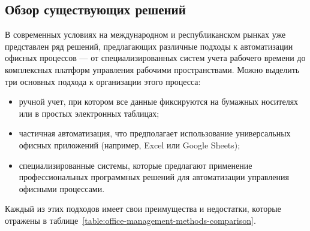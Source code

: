 \subsection{Обзор существующих решений}
\label{sub:domain:solution-overview}

В современных условиях на международном и республиканском рынках уже представлен ряд решений, предлагающих различные подходы к автоматизации офисных процессов — от специализированных систем учета рабочего времени до комплексных платформ управления рабочими пространствами. Можно выделить три основных подхода к организации этого процесса:

\begin{itemize}
    \item ручной учет, при котором все данные фиксируются на бумажных носителях или в простых электронных таблицах;
    \item частичная автоматизация, что предполагает использование универсальных офисных приложений (например, Excel или Google Sheets);
    \item специализированные системы, которые предлагают применение профессиональных программных решений для автоматизации управления офисными процессами.
\end{itemize}

Каждый из этих подходов имеет свои преимущества и недостатки, которые отражены в таблице~\ref{table:office-management-methods-comparison}.

